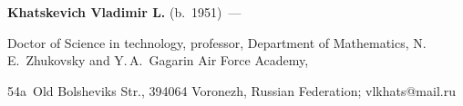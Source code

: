 \Contrl





\noindent


\textbf{Khatskevich Vladimir L.} (b.\ 1951)~--- 


Doctor of Science in technology, professor, Department of Mathematics, N.\,E.~Zhukovsky and Y.\,A.~Gagarin Air Force Academy, 


54a~Old Bolsheviks Str., 394064 Voronezh, Russian Federation; \mbox{vlkhats@mail.ru}








\label{end\stat}





\renewcommand{\bibname}{\protect\rm Литература}    


